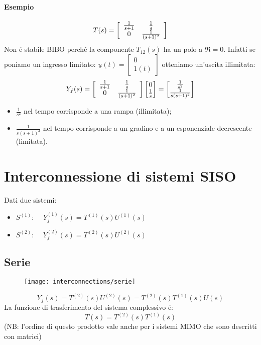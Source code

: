 \documentclass[../main.tex]{subfiles}
\begin{document}
	\paragraph{Esempio}
	\[ T(s) = \left[ \begin{array}{cc} \frac{1}{s+1} & \frac{1}{s}\\ 0 & \frac{1}{(s+1)^2} \end{array} \right] \]
	Non \'e stabile BIBO perch\'e la componente $ T_{12}(s) $ ha un polo a $ \Re = 0 $. Infatti se poniamo un ingresso limitato: $ \underline u(t) = \left[ \begin{matrix} 0\\ 1(t) \end{matrix} \right] $ otteniamo un'uscita illimitata:
	\[ Y_f(s) = \left[ \begin{array}{cc} \frac{1}{s+1} & \frac{1}{s}\\ 0 & \frac{1}{(s+1)^2} \end{array} \right] \left[ \begin{matrix} 0\\ \frac{1}{s} \end{matrix} \right] = \left[ \begin{matrix} \frac{1}{s^2}\\ \frac{1}{s(s+1)^2} \end{matrix} \right] \]
	\begin{itemize}
		\item $ \frac{1}{s^2} $ nel tempo corrisponde a una rampa (illimitata);
		\item $ \frac{1}{s(s+1)^2} $ nel tempo corrisponde a un gradino e a un esponenziale decrescente (limitata).
	\end{itemize}
	\section{Interconnessione di sistemi SISO}
	Dati due sistemi:
	\begin{itemize}
		\item $ S^{(1)} $: $ \quad Y_f^{(1)}(s) = T^{(1)}(s)U^{(1)}(s) $
		\item $ S^{(2)} $: $ \quad Y_f^{(2)}(s) = T^{(2)}(s)U^{(2)}(s) $
	\end{itemize}
	\subsection{Serie}
	\begin{wrapfigure}{R}{.3\linewidth}%
		\centering
		\texttt{[image: interconnections/serie]}%
	\end{wrapfigure}
	\leavevmode%
	\[ Y_f(s) = T^{(2)}(s)U^{(2)}(s) = T^{(2)}(s) T^{(1)}(s) U(s) \]
	La funzione di trasferimento del sistema complessivo \'e:
	\[ T(s) = T^{(2)}(s) T^{(1)}(s) \]
	(NB: l'ordine di questo prodotto vale anche per i sistemi MIMO che sono descritti con matrici)
\end{document}
